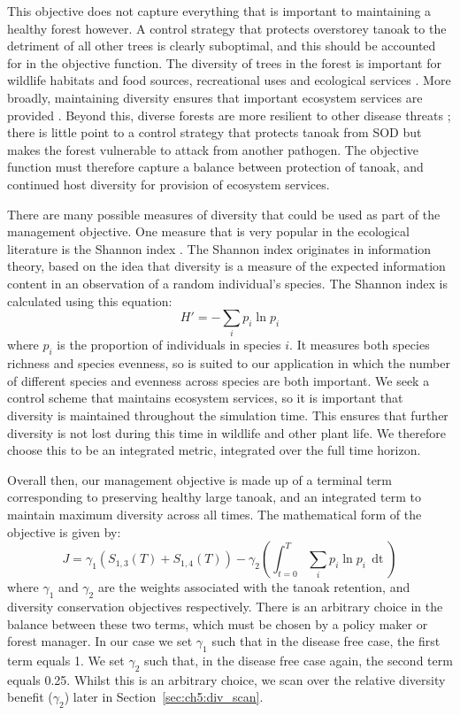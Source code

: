 This objective does not capture everything that is important to maintaining a healthy forest however. A control strategy that protects overstorey tanoak to the detriment of all other trees is clearly suboptimal, and this should be accounted for in the objective function. The diversity of trees in the forest is important for wildlife habitats and food sources, recreational uses and ecological services \citep{swiecki_reference_2013}. More broadly, maintaining diversity ensures that important ecosystem services are provided \citep{cadotte_beyond_2011, gamfeldt_higher_2013}. Beyond this, diverse forests are more resilient to other disease threats \citep{keesing_impacts_2010}; there is little point to a control strategy that protects tanoak from SOD but makes the forest vulnerable to attack from another pathogen. The objective function must therefore capture a balance between protection of tanoak, and continued host diversity for provision of ecosystem services.

There are many possible measures of diversity that could be used as part of the management objective. One measure that is very popular in the ecological literature is the Shannon index \citep[][pp.\ 106--108]{magurran_measuring_2013}. The Shannon index originates in information theory, based on the idea that diversity is a measure of the expected information content in an observation of a random individual's species. The Shannon index is calculated using this equation:
\begin{equation}\label{eqn:ch5:shannon_idx}
    H' = -\sum_ip_i\ln{p_i}
\end{equation}
where $p_i$ is the proportion of individuals in species $i$. It measures both species richness and species evenness, so is suited to our application in which the number of different species and evenness across species are both important. We seek a control scheme that maintains ecosystem services, so it is important that diversity is maintained throughout the simulation time. This ensures that further diversity is not lost during this time in wildlife and other plant life. We therefore choose this to be an integrated metric, integrated over the full time horizon.

Overall then, our management objective is made up of a terminal term corresponding to preserving healthy large tanoak, and an integrated term to maintain maximum diversity across all times. The mathematical form of the objective is given by:
\begin{equation}\label{eqn:ch5:mgmt_obj}
    J = \gamma_1\left(S_{1,3}(T) + S_{1,4}(T)\right) - \gamma_2\left(\int_{t=0}^T \sum_ip_i\ln{p_i}\,\mathop{dt}\right)
\end{equation}
where $\gamma_1$ and $\gamma_2$ are the weights associated with the tanoak retention, and diversity conservation objectives respectively. There is an arbitrary choice in the balance between these two terms, which must be chosen by a policy maker or forest manager. In our case we set $\gamma_1$ such that in the disease free case, the first term equals 1. We set $\gamma_2$ such that, in the disease free case again, the second term equals 0.25. Whilst this is an arbitrary choice, we scan over the relative diversity benefit ($\gamma_2$) later in Section~\ref{sec:ch5:div_scan}.

